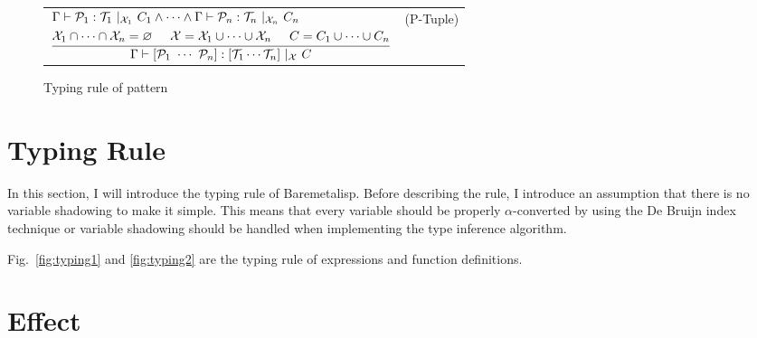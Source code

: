 \documentclass{article}
\begin{document}
\begin{figure}[tb]
\begin{tabular}{rlrl}
        \multicolumn{3}{r}{
        $\dfrac{
            \begin{aligned}
                &\Gamma \vdash \mathcal{P}_1 : \mathcal{T}_1\ |_{\mathcal{X}_1}\ C_1 \land \cdots \land
                    \Gamma \vdash \mathcal{P}_n : \mathcal{T}_n\ |_{\mathcal{X}_n}\ C_n \\
                &\mathcal{X}_1 \cap \cdots \cap \mathcal{X}_n = \varnothing \hspace{5mm}
                    \mathcal{X} = \mathcal{X}_1 \cup \cdots \cup \mathcal{X}_n \hspace{5mm}
                    C = C_1 \cup \cdots \cup C_n
            \end{aligned}
        }{
            \Gamma \vdash [\mathcal{P}_1\ \cdots\ \mathcal{P}_n] : [\mathcal{T}_1 \cdots \mathcal{T}_n]\ |_{\mathcal{X}}\ C
        }$} & (P-Tuple) \\
    \end{tabular}
    \caption{Typing rule of pattern}
\end{figure}

\section{Typing Rule}

In this section, I will introduce the typing rule of Baremetalisp.
Before describing the rule, I introduce an assumption
that there is no variable shadowing to make it simple.
This means that every variable should be properly $\alpha$-converted
by using the De Bruijn index technique or variable shadowing should be handled
when implementing the type inference algorithm.

Fig.~\ref{fig:typing1} and \ref{fig:typing2} are the typing rule of
expressions and function definitions.

\section{Effect}
\label{sec:effect}
\end{document}
